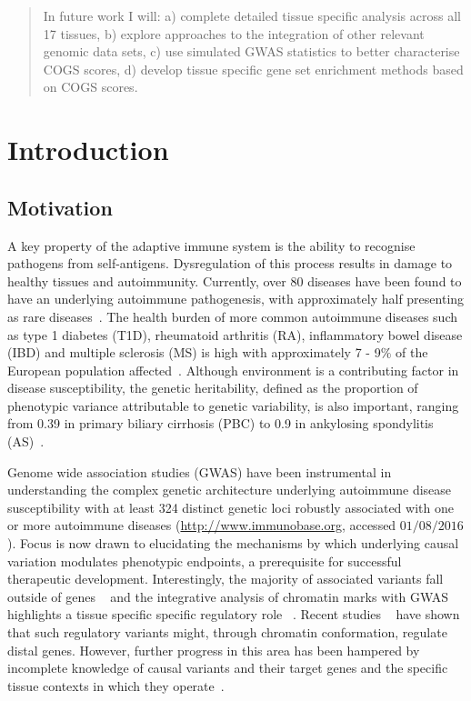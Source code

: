 \documentclass[a4paper,11pt]{report}
\begin{document}
\begin{abstract}
In future work I will: a) complete detailed tissue specific analysis across all 17 tissues, b) explore approaches to the integration of other relevant genomic data sets, c) use simulated GWAS statistics to better characterise COGS scores, d) develop tissue specific gene set enrichment methods based on COGS scores.  
\end{abstract}


\onehalfspacing
\tableofcontents
\clearpage


\chapter{Introduction}
\section{Motivation}

A key property of the adaptive immune system is the ability to recognise pathogens from self-antigens.  Dysregulation of this process results in damage to healthy tissues and autoimmunity. Currently, over 80 diseases have been found to have an underlying autoimmune pathogenesis, with approximately half presenting as rare diseases~\citep{HayterCook2012}. The health burden of more common autoimmune diseases such as type 1 diabetes (T1D), rheumatoid arthritis (RA), inflammatory bowel disease (IBD) and multiple sclerosis (MS) is high with approximately 7 - 9$\%$ of the European population affected~\citep{CooperBynumSomers2009}. Although environment is a contributing factor in disease susceptibility, the genetic heritability, defined as the proportion of phenotypic variance attributable to genetic variability, is also important, ranging from 0.39 in primary biliary cirrhosis (PBC) to 0.9 in ankylosing spondylitis (AS)~\citep{Gutierrez-ArcelusRichRaychaudhuri2016}.  

Genome wide association studies (GWAS) have been instrumental in understanding the complex genetic architecture underlying autoimmune disease susceptibility with at least 324 distinct genetic loci robustly associated with one or more autoimmune diseases (\url{http://www.immunobase.org}, accessed $01/08/2016$). Focus is now drawn to elucidating the mechanisms by which underlying causal variation modulates phenotypic endpoints, a prerequisite for successful therapeutic development. Interestingly, the majority of associated variants fall outside of genes ~\citep{MauranoHumbertRynesEtAl2012} and the integrative analysis of chromatin marks with GWAS highlights a tissue specific specific regulatory role ~\citep{FarhMarsonZhuEtAl2015}.  Recent studies ~\citep{ClaussnitzerDankelKimEtAl2015,SmemoTenaKimEtAl2014,Davison2012-zk} have shown that such regulatory variants might, through chromatin conformation, regulate distal genes. However, further progress in this area has been hampered by incomplete knowledge of causal variants and their target genes and the specific tissue contexts in which they operate~\citep{Albert2015-jn}.
\end{document}
